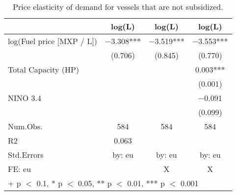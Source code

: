 \begin{table}

\caption{\label{tab:}Price elasticity of demand for vessels that are not subsidized.}
\centering
\begin{tabular}[t]{lccc}
\toprule
  & log(L) & log(L)  & log(L)  \\
\midrule
log(Fuel price [MXP / L]) & \num{-3.308}*** & \num{-3.519}*** & \num{-3.553}***\\
 & (\num{0.706}) & (\num{0.845}) & (\num{0.770})\\
Total Capacity (HP) &  &  & \num{0.003}***\\
 &  &  & (\num{0.001})\\
NINO 3.4 &  &  & \num{-0.091}\\
 &  &  & (\num{0.099})\\
\midrule
Num.Obs. & \num{584} & \num{584} & \num{584}\\
R2 & \num{0.063} &  & \\
Std.Errors & by: eu & by: eu & by: eu\\
FE: eu &  & X & X\\
\bottomrule
\multicolumn{4}{l}{\rule{0pt}{1em}+ p $<$ 0.1, * p $<$ 0.05, ** p $<$ 0.01, *** p $<$ 0.001}\\
\end{tabular}
\end{table}
